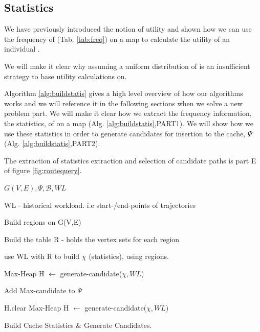 



\subsection{Statistics}

We have previously introduced the notion of utility and shown how we can use the frequency of \spaths (Tab. \ref{tab:freq}) on a map to calculate the utility of an individual \spathns. 

We will make it clear why assuming a uniform distribution of \spaths is an insufficient strategy to base utility calculations on.

Algorithm \ref{alg:buildstatis} gives a high level overview of how our algorithms works and we will reference it in the following sections when we solve a new problem part.
We will make it clear how we extract the frequency information, the statistics, of \spaths on a map (Alg. \ref{alg:buildstatis},PART1). We will show how we use these statistics in order to generate \spath candidates for insertion to the cache, $\Psi$ (Alg. \ref{alg:buildstatis},PART2).

The extraction of statistics extraction and selection of candidate paths is part E of figure \ref{fig:routequery}.



\begin{algorithm} [H!bt]
\dontprintsemicolon
\SetVline


\Input
{
$G(V,E), \Psi, \mathcal{B}, WL$
}

WL - historical workload. i.e start-/end-points of trajectories \;

Build regions on G(V,E) \;

Build the table R - holds the vertex sets for each region \;

use WL with R to build $\chi$ (statistics), using regions. \;


{
    Max-Heap H $\leftarrow$ generate-candidate($\chi, WL$) \;
}

{
    Add Max-candidate to $\Psi$ \;

    H.clear \;
    {
	Max-Heap H $\leftarrow$ generate-candidate($\chi, WL$) \;
    }
}

\caption{Build Cache Statistics \& Generate Candidates.}
\label{alg:buildstatis}
\end{algorithm}

